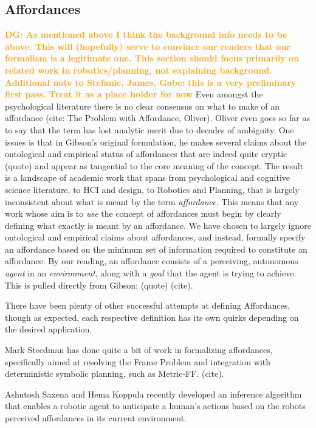 \documentclass[]{article}
\newcommand{\dgnote}[1]{\textcolor{Orange}{\textbf{DG: #1}}}
\begin{document}
\subsection{Affordances}
\dgnote{As mentioned above I think the background info needs to be above. This will (hopefully) serve to convince our readers that our formalism is a legitimate one. This section should focus primarily on related work in robotics/planning, not explaining background. Additional note to Stefanie, James, Gabe: this is a very preliminary first pass. Treat it as a place holder for now}
Even amongst the psychological literature there is no clear consensus on what to make of an affordance (cite: The Problem with Affordance, Oliver). Oliver even goes so far as to say that the term has lost analytic merit due to decades of ambiguity. One issues is that in Gibson's original formulation, he makes several claims about the ontological and empirical status of affordances that are indeed quite cryptic (quote) and appear as tangential to the core meaning of the concept. The result is a landscape of academic work that spans from psychological and cognitive science literature, to HCI and design, to Robotics and Planning, that is largely inconsistent about what is meant by the term {\it affordance}. This means that any work whose aim is to {\it use} the concept of affordances must begin by clearly defining what exactly is meant by an affordance. We have chosen to largely ignore ontological and empirical claims about affordances, and instead, formally specify an affordance based on the minimum set of information required to constitute an affordance. By our reading, an affordance consists of a perceiving, autonomous {\it agent} in an {\it environment}, along with a {\it goal} that the agent is trying to achieve. This is pulled directly from Gibson: (quote) (cite). 

There have been plenty of other successful attempts at defining Affordances, though as expected, each respective definition
has its own quirks depending on the desired application.

Mark Steedman has done quite a bit of work in formalizing affordances, specifically aimed at resolving the Frame Problem and integration with deterministic symbolic planning, such as Metric-FF. (cite).

Ashutosh Saxena and Hema Koppula recently developed an inference algorithm that enables a robotic agent to anticipate a human's actions based on the robots perceived affordances in its current environment. 
\end{document}
